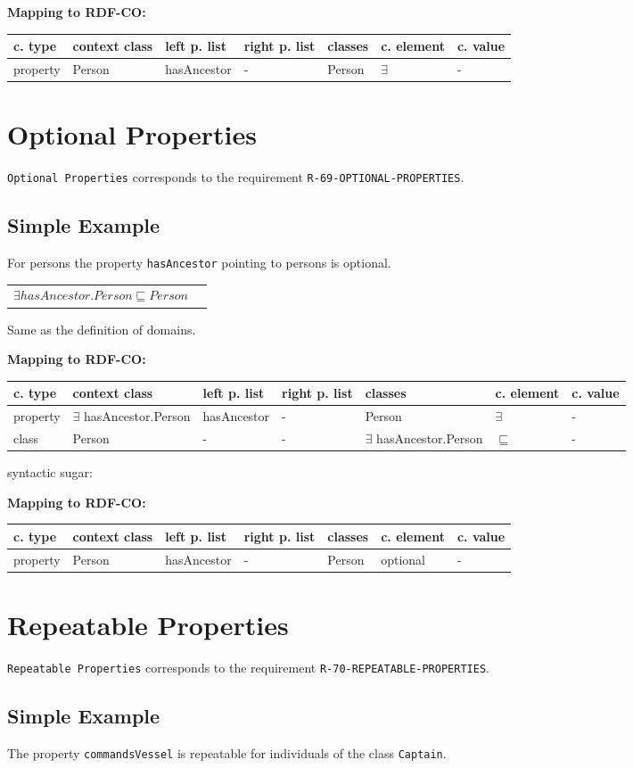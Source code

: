 \documentclass{llncs}
\newcommand{\ms}[1]{\texttt{#1}}
\newenvironment{gcotable}{
  \scriptsize
  \sffamily
  \vspace{0cm}
	\begin{center}
	\textbf{\vspace{0.4cm}Mapping to RDF-CO:} \\
  \begin{tabular}{l|l|l|l|l|l|l}
	\hline
  \textbf{c. type} & \textbf{context class} & \textbf{left p. list} & \textbf{right p. list} & \textbf{classes} & \textbf{c. element} & \textbf{c. value} \\
  \hline

}{
  \hline
  \end{tabular}
	\end{center}
}
\newenvironment{DL}{
  \vspace{0cm}
	\begin{center}
  \begin{tabular}{r l}

}{
  \end{tabular}
	\end{center}
}
\begin{document}
\begin{gcotable}
property & Person & hasAncestor & - & Person & $\exists$ & - \\
\end{gcotable}

\section{Optional Properties}

\ms{Optional Properties} corresponds to the requirement \ms{R-69-OPTIONAL-PROPERTIES}.

\subsection{Simple Example}

For persons the property \ms{hasAncestor} pointing to persons is optional.

\begin{DL}
$\exists hasAncestor.Person \sqsubseteq Person$ \\
\end{DL}

Same as the definition of domains.

\begin{gcotable}
property & $\exists$ hasAncestor.Person & hasAncestor & - & Person & $\exists$ & - \\
class & Person & - & - & $\exists$ hasAncestor.Person & $\sqsubseteq$ & - \\
\end{gcotable}	

syntactic sugar:

\begin{gcotable}
property & Person & hasAncestor & - & Person & optional & - \\
\end{gcotable}

\section{Repeatable Properties}

\ms{Repeatable Properties} corresponds to the requirement \ms{R-70-REPEATABLE-PROPERTIES}.

\subsection{Simple Example}

The property \ms{commandsVessel} is repeatable for individuals of the class \ms{Captain}.
\end{document}
